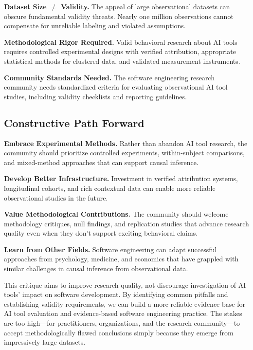 \documentclass[conference]{IEEEtran}
\begin{document}
\textbf{Dataset Size $\neq$ Validity.} The appeal of large observational datasets can obscure fundamental validity threats. Nearly one million observations cannot compensate for unreliable labeling and violated assumptions.

\textbf{Methodological Rigor Required.} Valid behavioral research about AI tools requires controlled experimental designs with verified attribution, appropriate statistical methods for clustered data, and validated measurement instruments.

\textbf{Community Standards Needed.} The software engineering research community needs standardized criteria for evaluating observational AI tool studies, including validity checklists and reporting guidelines.

\subsection{Constructive Path Forward}

\textbf{Embrace Experimental Methods.} Rather than abandon AI tool research, the community should prioritize controlled experiments, within-subject comparisons, and mixed-method approaches that can support causal inference.

\textbf{Develop Better Infrastructure.} Investment in verified attribution systems, longitudinal cohorts, and rich contextual data can enable more reliable observational studies in the future.

\textbf{Value Methodological Contributions.} The community should welcome methodology critiques, null findings, and replication studies that advance research quality even when they don't support exciting behavioral claims.

\textbf{Learn from Other Fields.} Software engineering can adapt successful approaches from psychology, medicine, and economics that have grappled with similar challenges in causal inference from observational data.

This critique aims to improve research quality, not discourage investigation of AI tools' impact on software development. By identifying common pitfalls and establishing validity requirements, we can build a more reliable evidence base for AI tool evaluation and evidence-based software engineering practice. The stakes are too high—for practitioners, organizations, and the research community—to accept methodologically flawed conclusions simply because they emerge from impressively large datasets.
\end{document}
